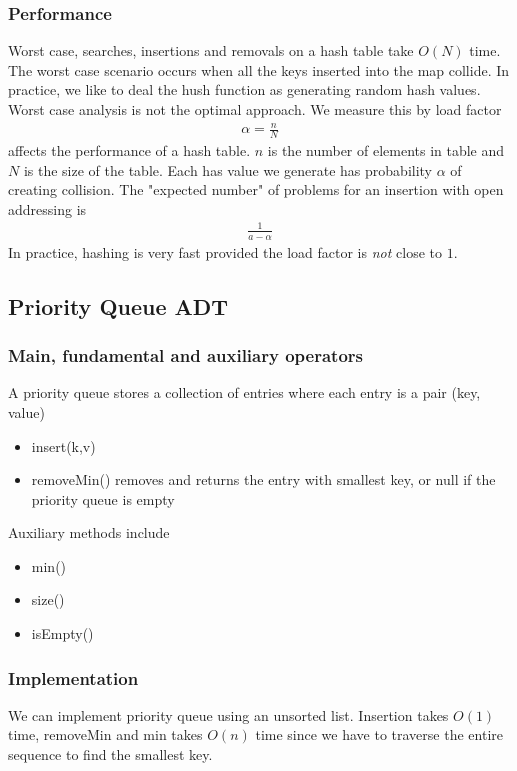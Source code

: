 \documentclass[a4paper]{article}
\theoremstyle{plain}
\theoremstyle{definition}
\theoremstyle{remark}
\begin{document}
\subsubsection{Performance}
Worst case, searches, insertions and removals on a hash table take $O(N)$ time. The worst case scenario occurs when all the keys inserted into the map collide. In practice, we like to deal the hush function as generating random hash values. Worst case analysis is not the optimal approach. We measure this by load factor
\begin{align*}
	\alpha = \frac{n}{N}
\end{align*}
affects the performance of a hash table. $n$ is the number of elements in table and $N$ is the size of the table. Each has value we generate has probability $\alpha$ of creating collision. The "expected number" of problems for an insertion with open addressing is
\begin{align*}
	\frac{1}{a-\alpha}
\end{align*}
In practice, hashing is very fast provided the load factor is \textit{not} close to $1 $.
\subsection{Priority Queue ADT}
\subsubsection{Main, fundamental and auxiliary operators}
A priority queue stores a collection of entries where each entry is a pair (key, value)
\begin{itemize}
	\item insert(k,v)
	\item removeMin() removes and returns the entry with smallest key, or null if the priority queue is empty
\end{itemize}
Auxiliary methods include
\begin{itemize}
	\item min()
	\item size()
	\item isEmpty()
\end{itemize}
\subsubsection{Implementation}
We can implement priority queue using an unsorted list. Insertion takes $O(1)$ time, removeMin and min takes $O(n)$ time since we have to traverse the entire sequence to find the smallest key.
\end{document}
